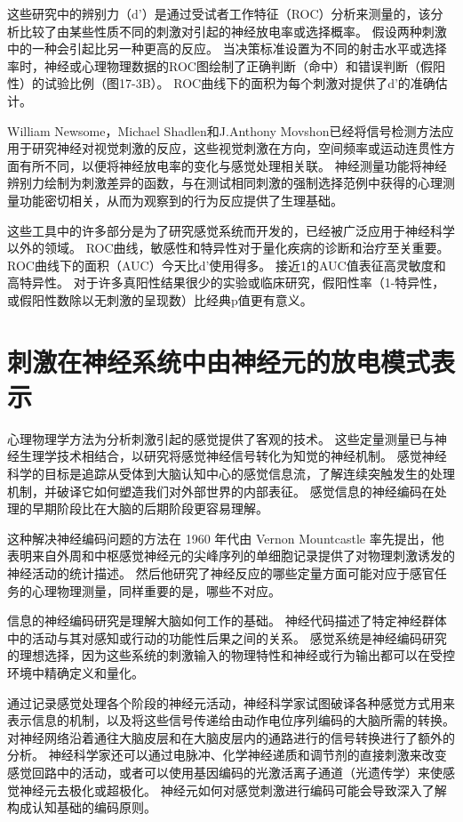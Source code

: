 \begin{proposition}
	\quad \quad 这些研究中的辨别力（d'）是通过受试者工作特征（ROC）分析来测量的，该分析比较了由某些性质不同的刺激对引起的神经放电率或选择概率。
	假设两种刺激中的一种会引起比另一种更高的反应。
	当决策标准设置为不同的射击水平或选择率时，神经或心理物理数据的ROC图绘制了正确判断（命中）和错误判断（假阳性）的试验比例（图17-3B）。
	ROC曲线下的面积为每个刺激对提供了d'的准确估计。
	
	\quad \quad William Newsome，Michael Shadlen和J.Anthony Movshon已经将信号检测方法应用于研究神经对视觉刺激的反应，这些视觉刺激在方向，空间频率或运动连贯性方面有所不同，以便将神经放电率的变化与感觉处理相关联。
	神经测量功能将神经辨别力绘制为刺激差异的函数，与在测试相同刺激的强制选择范例中获得的心理测量功能密切相关，从而为观察到的行为反应提供了生理基础。
	
	\quad \quad 这些工具中的许多部分是为了研究感觉系统而开发的，已经被广泛应用于神经科学以外的领域。
	ROC曲线，敏感性和特异性对于量化疾病的诊断和治疗至关重要。
	ROC曲线下的面积（AUC）今天比d'使用得多。
	接近1的AUC值表征高灵敏度和高特异性。
	对于许多真阳性结果很少的实验或临床研究，假阳性率（1-特异性，或假阳性数除以无刺激的呈现数）比经典p值更有意义。
	
\end{proposition}



\section{刺激在神经系统中由神经元的放电模式表示}
心理物理学方法为分析刺激引起的感觉提供了客观的技术。 
这些定量测量已与神经生理学技术相结合，以研究将感觉神经信号转化为知觉的神经机制。 
感觉神经科学的目标是追踪从受体到大脑认知中心的感觉信息流，了解连续突触发生的处理机制，并破译它如何塑造我们对外部世界的内部表征。 
感觉信息的神经编码在处理的早期阶段比在大脑的后期阶段更容易理解。


这种解决神经编码问题的方法在 1960 年代由 Vernon Mountcastle 率先提出，他表明来自外周和中枢感觉神经元的尖峰序列的单细胞记录提供了对物理刺激诱发的神经活动的统计描述。 然后他研究了神经反应的哪些定量方面可能对应于感官任务的心理物理测量，同样重要的是，哪些不对应。


信息的神经编码研究是理解大脑如何工作的基础。
神经代码描述了特定神经群体中的活动与其对感知或行动的功能性后果之间的关系。 
感觉系统是神经编码研究的理想选择，因为这些系统的刺激输入的物理特性和神经或行为输出都可以在受控环境中精确定义和量化。


通过记录感觉处理各个阶段的神经元活动，神经科学家试图破译各种感觉方式用来表示信息的机制，以及将这些信号传递给由动作电位序列编码的大脑所需的转换。 
对神经网络沿着通往大脑皮层和在大脑皮层内的通路进行的信号转换进行了额外的分析。 
神经科学家还可以通过电脉冲、化学神经递质和调节剂的直接刺激来改变感觉回路中的活动，或者可以使用基因编码的光激活离子通道（光遗传学）来使感觉神经元去极化或超极化。 
神经元如何对感觉刺激进行编码可能会导致深入了解构成认知基础的编码原则。


